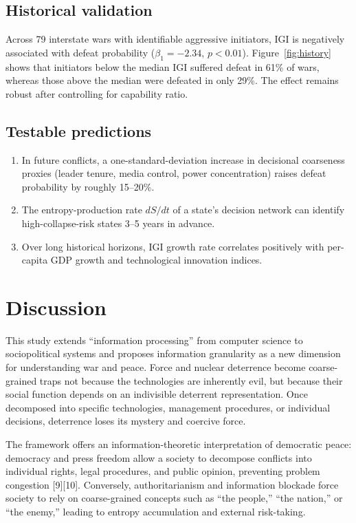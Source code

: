 \documentclass[11pt,a4paper]{article}
\begin{document}
\subsection{Historical validation}

Across 79 interstate wars with identifiable aggressive initiators, IGI is negatively associated with defeat probability ($\beta_1=-2.34$, $p<0.01$). Figure~\ref{fig:history} shows that initiators below the median IGI suffered defeat in 61\% of wars, whereas those above the median were defeated in only 29\%. The effect remains robust after controlling for capability ratio.

\subsection{Testable predictions}

\begin{enumerate}
    \item In future conflicts, a one-standard-deviation increase in decisional coarseness proxies (leader tenure, media control, power concentration) raises defeat probability by roughly 15--20\%.
    \item The entropy-production rate $dS/dt$ of a state's decision network can identify high-collapse-risk states 3--5 years in advance.
    \item Over long historical horizons, IGI growth rate correlates positively with per-capita GDP growth and technological innovation indices.
\end{enumerate}

\section{Discussion}

This study extends ``information processing'' from computer science to sociopolitical systems and proposes information granularity as a new dimension for understanding war and peace. Force and nuclear deterrence become coarse-grained traps not because the technologies are inherently evil, but because their social function depends on an indivisible deterrent representation. Once decomposed into specific technologies, management procedures, or individual decisions, deterrence loses its mystery and coercive force.

The framework offers an information-theoretic interpretation of democratic peace: democracy and press freedom allow a society to decompose conflicts into individual rights, legal procedures, and public opinion, preventing problem congestion [9][10]. Conversely, authoritarianism and information blockade force society to rely on coarse-grained concepts such as ``the people,'' ``the nation,'' or ``the enemy,'' leading to entropy accumulation and external risk-taking.
\end{document}

